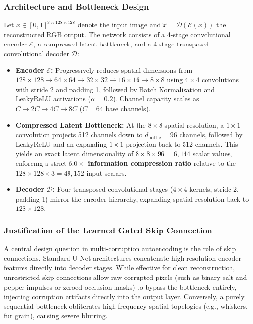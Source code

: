 \documentclass[conference]{IEEEtran}
\begin{document}
\subsubsection{Architecture and Bottleneck Design}
Let $x \in [0, 1]^{3 \times 128 \times 128}$ denote the input image and $\hat{x} = \mathcal{D}(\mathcal{E}(x))$ the reconstructed RGB output. The network consists of a 4-stage convolutional encoder $\mathcal{E}$, a compressed latent bottleneck, and a 4-stage transposed convolutional decoder $\mathcal{D}$:
\begin{itemize}
    \item \textbf{Encoder $\mathcal{E}$:} Progressively reduces spatial dimensions from $128 \times 128 \to 64 \times 64 \to 32 \times 32 \to 16 \times 16 \to 8 \times 8$ using $4 \times 4$ convolutions with stride 2 and padding 1, followed by Batch Normalization and LeakyReLU activations ($\alpha = 0.2$). Channel capacity scales as $C \to 2C \to 4C \to 8C$ ($C=64$ base channels).
    \item \textbf{Compressed Latent Bottleneck:} At the $8 \times 8$ spatial resolution, a $1 \times 1$ convolution projects 512 channels down to $d_{\text{bottle}} = 96$ channels, followed by LeakyReLU and an expanding $1 \times 1$ projection back to 512 channels. This yields an exact latent dimensionality of $8 \times 8 \times 96 = 6,144$ scalar values, enforcing a strict \textbf{$6.0\times$ information compression ratio} relative to the $128 \times 128 \times 3 = 49,152$ input scalars.
    \item \textbf{Decoder $\mathcal{D}$:} Four transposed convolutional stages ($4 \times 4$ kernels, stride 2, padding 1) mirror the encoder hierarchy, expanding spatial resolution back to $128 \times 128$.
\end{itemize}

\subsubsection{Justification of the Learned Gated Skip Connection}
A central design question in multi-corruption autoencoding is the role of skip connections. Standard U-Net architectures concatenate high-resolution encoder features directly into decoder stages. While effective for clean reconstruction, unrestricted skip connections allow raw corrupted pixels (such as binary salt-and-pepper impulses or zeroed occlusion masks) to bypass the bottleneck entirely, injecting corruption artifacts directly into the output layer. Conversely, a purely sequential bottleneck obliterates high-frequency spatial topologies (e.g., whiskers, fur grain), causing severe blurring.
\end{document}
